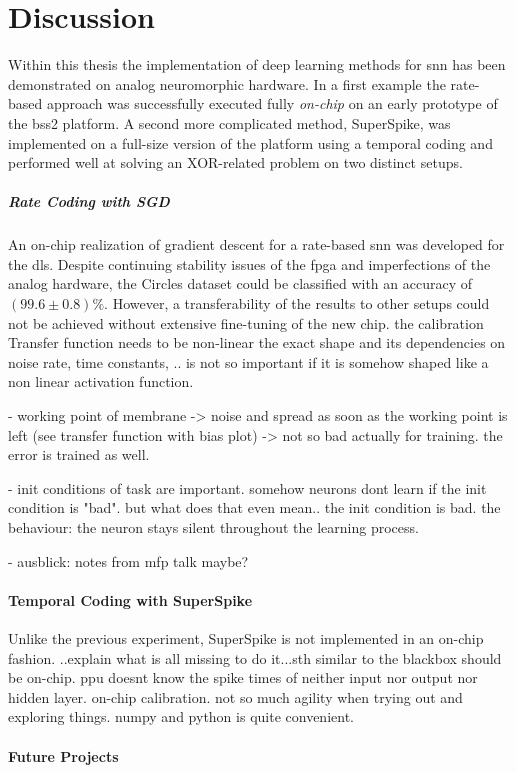 \chapter{Discussion}
Within this thesis the implementation of deep learning methods for \gls{snn} has been demonstrated on analog neuromorphic hardware. In a first example the rate-based approach was successfully executed fully \emph{on-chip} on an early prototype of the \acrfull{bss2} platform. A second more complicated method, SuperSpike, was implemented on a full-size version of the platform using a temporal coding and performed well at solving  an XOR-related problem on two distinct setups.

\paragraph{Rate Coding with SGD} An on-chip realization of gradient descent for a rate-based \gls{snn} was developed for the \gls{dls}. Despite continuing stability issues of the \gls{fpga} and imperfections of the analog hardware, the Circles dataset could be classified with an accuracy of $(99.6 \pm 0.8) \%$. However, a transferability of the results to other setups could not be achieved without extensive fine-tuning of the new chip.  the calibration Transfer function needs to be non-linear the exact shape and its dependencies on noise rate, time constants, .. is not so important if it is somehow shaped like a non linear activation function.

- working point of membrane -> noise and spread as soon as the working point is left (see transfer function with bias plot) -> not so bad actually for training. the error is trained as well. 

- init conditions of task are important. somehow neurons dont learn if the init condition is "bad". but what does that even  mean.. the init condition is bad. the behaviour: the neuron stays silent throughout the learning process. 

- ausblick: notes from mfp talk maybe?
\subsubsection{Temporal Coding with SuperSpike}
Unlike the previous experiment, SuperSpike is not implemented in an on-chip fashion. ..explain what is all missing to do it...sth similar to the blackbox should be on-chip. ppu doesnt know the spike times of neither input nor output nor hidden layer. on-chip calibration. not so much agility when trying out and exploring things. numpy and python is quite convenient.
\subsubsection*{Future Projects}
\label{futureprojects}